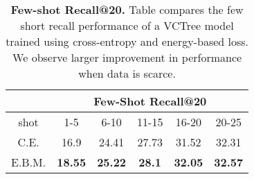 \documentclass[final]{cvpr}
\begin{document}
\begin{table}[]
\centering
\begin{tabular}{@{}cccccc@{}}
\toprule
\toprule
                       & \multicolumn{5}{c}{Few-Shot Recall@20} \\ \midrule
 shot & 1-5    & 6-10  & 11-15 & 16-20 & 20-25 \\ \midrule
C.E.                    & 16.9   & 24.41 & 27.73 & 31.52 & 32.31 \\
E.B.M.                & \textbf{18.55}  & \textbf{25.22} & \textbf{28.1}  & \textbf{32.05} & \textbf{32.57} \\
\bottomrule \bottomrule
\end{tabular}
\caption{\textbf{Few-shot Recall@20.} Table compares the few short recall performance of a VCTree \cite{tang2019learning} model trained using cross-entropy and energy-based loss. We observe larger improvement in performance when data is scarce.}
\label{table:kshot}
\vspace{-0.1in}
\end{table}
\begin{table}[t]
\caption{\textbf{Sentence to Graph Retrieval.} We compare the scene graph retrieval performance on gallery of  and  images.}
\label{table:sentencetograph}
\vspace{-0.1in}
\end{table}
\end{document}
